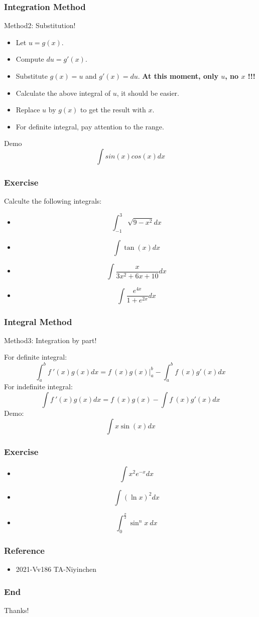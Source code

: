 \documentclass{beamer}
\begin{document}
\begin{frame}
    \frametitle{Integration Method}
    Method2: Substitution!\\
    \vspace{1em}
    \begin{itemize}
        \item Let $u=g(x)$.
        \item Compute $du=g'(x)$.
        \item Substitute $g(x)=u$ and $g'(x)=du$. \textbf{At this moment, only $u$, no $x$ !!!}
        \item Calculate the above integral of $u$, it should be easier.
        \item Replace $u$ by $g(x)$ to get the result with $x$.
        \item For definite integral, pay attention to the range.
    \end{itemize}
    \begin{block}{Demo}
        $$\int sin(x) cos(x) dx$$
    \end{block}
\end{frame}
\begin{frame}
    \frametitle{Exercise}
    Calculte the following integrals:
    \begin{itemize}
        \item $$\int_{-1}^3 \sqrt{9-x^2} dx$$
        \item $$\int \tan(x) dx$$
        \item $$\int \frac{x}{3x^2+6x+10} dx$$
        \item $$\int \frac{e^{4x}}{1+e^{2x}} dx$$
    \end{itemize}
\end{frame}
\begin{frame}
    \frametitle{Integral Method}
    Method3: Integration by part!\\
    \vspace{1em}

    For definite integral:
    $$\int_a^b f~'(x)g(x) dx=f~(x)g(x) \Big|_a^b-\int_a^b f~(x)g'(x) dx$$
    For indefinite integral:
    $$\int f~'(x)g(x) dx=f~(x)g(x) -\int f~(x)g'(x) dx$$
    Demo:
    $$\int x \sin (x) dx$$
\end{frame}
\begin{frame}
    \frametitle{Exercise}

    \begin{itemize}
        \item $$\int x^2 e^{-x} dx$$
        \item $$\int (\ln x)^2 dx$$
        \item $$\int_0^{\frac{\pi}{2}} \sin^n x ~dx$$
    \end{itemize}

\end{frame}

\begin{frame}
    \frametitle{Reference}
    \begin{itemize}
        \item 2021-Vv186 TA-Niyinchen
    \end{itemize}
\end{frame}
\begin{frame}
    \frametitle{End}
    \centering
    \LARGE{Thanks!}


\end{frame}
\end{document}
